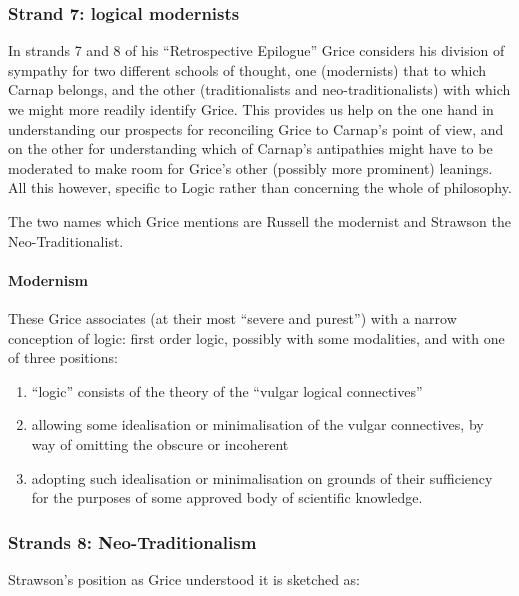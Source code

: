 \documentclass[10pt,titlepage]{book}
\begin{document}
\subsubsection{Strand 7: logical modernists}

In strands 7 and 8 of his ``Retrospective Epilogue'' Grice considers his division of sympathy for two different schools of thought, one (modernists) that to which Carnap belongs, and the other (traditionalists and neo-traditionalists) with which we might more readily identify Grice.
This provides us help on the one hand in understanding our prospects for reconciling Grice to Carnap's point of view, and on the other for understanding which of Carnap's antipathies might have to be moderated to make room for Grice's other (possibly more prominent) leanings.
All this however, specific to Logic rather than concerning the whole of philosophy.

The two names which Grice mentions are Russell the modernist and Strawson the Neo-Traditionalist.

\paragraph{Modernism}

These Grice associates (at their most ``severe and purest'') with a narrow conception of logic: first order logic, possibly with some modalities, and with one of three positions:

\begin{enumerate}
\item ``logic'' consists of the theory of the ``vulgar logical connectives''

\item allowing some idealisation or minimalisation of the vulgar connectives, by way of omitting the obscure or incoherent

\item adopting such idealisation or minimalisation on grounds of their sufficiency for the purposes of some approved body of scientific knowledge.
\end{enumerate}

\subsubsection{Strands 8: Neo-Traditionalism}

Strawson's position as Grice understood it is sketched as:
\end{document}
